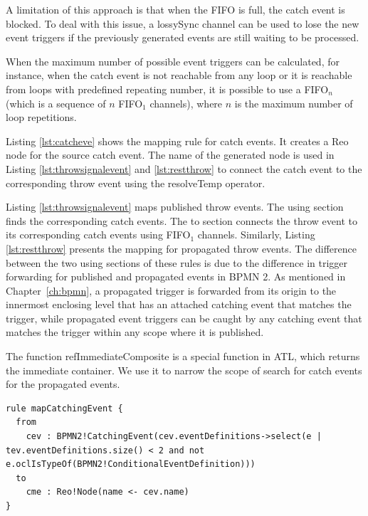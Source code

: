 A limitation of this approach is that when the {FIFO} is full, the {catch} event is blocked. To deal with this issue, a {lossySync} channel can be used to lose the new event triggers if the previously generated events are still waiting to be processed. 

When the maximum number of possible event triggers can be calculated, for instance, when the {catch} event is not reachable from any loop or it is reachable from loops with predefined repeating number, it is possible to use a {FIFO}$_n$ (which is a sequence of $n$ {FIFO}$_1$ channels), where $n$ is the maximum number of loop repetitions.  

Listing \ref{lst:catcheve} shows the mapping rule for {catch event}s. It creates a Reo {node} for the source {catch event}. The name of the generated {node} is used in Listing \ref{lst:throwsignalevent} and \ref{lst:restthrow}  to connect the {catch event} to the corresponding {throw event} using the  {resolveTemp} operator. 

Listing \ref{lst:throwsignalevent} maps published {throw event}s. The {using} section finds the corresponding {catch events}. The {to} section connects the throw event to its corresponding catch events using {FIFO}$_1$ channels. Similarly, Listing \ref{lst:restthrow} presents the mapping for propagated {throw event}s. The difference between the two using sections of these rules is due to the difference in trigger forwarding for published and propagated events in BPMN 2. As mentioned in Chapter~\ref{ch:bpmn}, a propagated trigger is forwarded from its origin to the innermost enclosing level that has an attached catching event that matches the trigger, while propagated event triggers can be caught by any catching event that matches the trigger within any scope where it is published.

The function {refImmediateComposite} is a special function in ATL, which returns the immediate container. We use it to narrow the scope of search for catch events for the propagated events.

\begin{lstlisting}[float,frame=single,caption=Mapping non-conditional catch event,label=lst:catcheve]
rule mapCatchingEvent {
  from
    cev : BPMN2!CatchingEvent(cev.eventDefinitions->select(e | tev.eventDefinitions.size() < 2 and not e.oclIsTypeOf(BPMN2!ConditionalEventDefinition)))
  to
    cme : Reo!Node(name <- cev.name)
}
\end{lstlisting}

